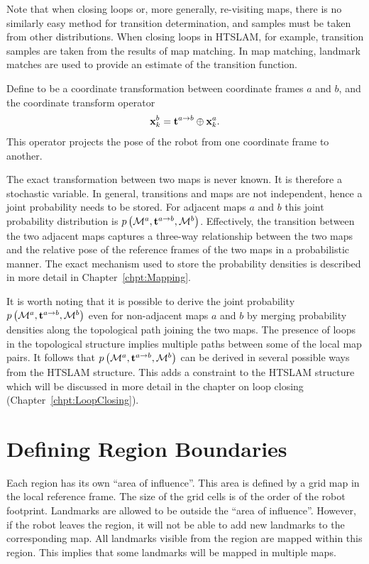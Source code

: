 Note that when closing loops or, more generally, re-visiting maps,
there is no similarly easy method for transition determination, and samples
must be taken from other distributions. When closing
loops in HTSLAM, for example, transition samples are taken from the results of map
matching. In map matching, landmark matches are used to provide an estimate of
the transition function.

Define  to be a coordinate transformation between
coordinate frames $a$ and $b$, and the coordinate transform operator
\transit\ 
$$
\x{k}{}{b} = \tr{}{a}{b} \transit \x{k}{}{a}.
$$
This operator projects the pose of the robot from one coordinate frame to
another.

The exact transformation between two maps is never known. It is
therefore a stochastic variable. In general, transitions and maps are
not independent, hence a joint probability needs to be stored. For
adjacent maps $a$ and $b$ this joint probability distribution is
$\prob{\map{}{}{a},\tr{}{a}{b}, \map{}{}{b}}$. Effectively,
the transition between the two adjacent maps captures a three-way
relationship between the two maps and the relative pose of the
reference frames of the two maps in a probabilistic manner. The exact
mechanism used to store the probability densities is described in more
detail in Chapter~\ref{chpt:Mapping}.

It is worth noting that it is possible to derive the joint probability
$\prob{\map{}{}{a},\tr{}{a}{b},\map{}{}{b}}$ even for non-adjacent
maps $a$ and $b$ by merging probability densities along the
topological path joining the two maps.  The presence of loops in the
topological structure implies multiple paths between some of the local
map pairs. It follows that
$\prob{\map{}{}{a},\tr{}{a}{b},\map{}{}{b}}$ can be derived in several
possible ways from the HTSLAM structure. This adds a constraint to the
HTSLAM structure which will be discussed in more detail in the chapter
on loop closing (Chapter~\ref{chpt:LoopClosing}).




\section{Defining Region Boundaries}
\label{sec:region}

Each region has its own ``area of influence''. This area is defined by
a grid map in the local reference frame. The size of the grid cells is
of the order of the robot footprint. Landmarks are allowed to be
outside the ``area of influence''. However, if the robot leaves the
region, it will not be able to add new landmarks to the corresponding
map. All landmarks visible from the region are mapped within
this region. This implies that some landmarks will be mapped in
multiple maps.

